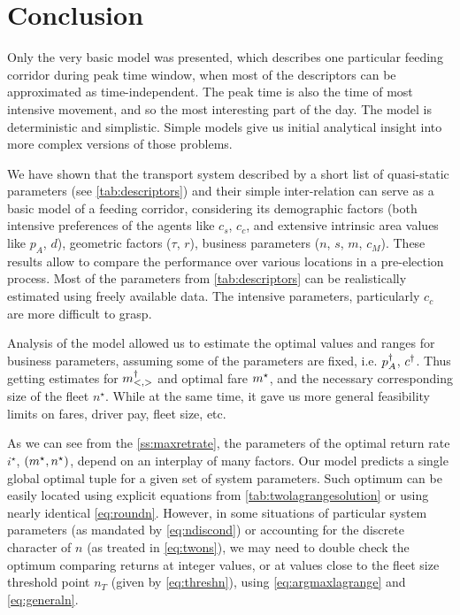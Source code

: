 \documentclass[a4paper]{report}
\begin{document}
\section{Conclusion}
Only the very basic model was presented, which describes one particular feeding corridor during peak time window, when most of the descriptors can be approximated as time-independent. The peak time is also the time of most intensive movement, and so the most interesting part of the day. The model is deterministic and simplistic. Simple models give us initial analytical insight into more complex versions of those problems.

We have shown that the transport system described by a short list of quasi-static parameters (see \autoref{tab:descriptors}) and their simple inter-relation  can serve as a basic model of a feeding corridor, considering its demographic factors (both intensive preferences of the agents like $c_s$, $c_c$, and extensive intrinsic area values like $p_A$, $d$), geometric factors ($\tau$, $r$), business parameters ($n$, $s$, $m$, $c_M$). These results allow to compare the performance over various locations in a pre-election process. Most of the parameters from \autoref{tab:descriptors} can be realistically estimated using freely available data. The intensive parameters, particularly $c_c$ are more difficult to grasp. 

Analysis of the model allowed us to estimate the optimal values and ranges for business parameters, assuming some of the parameters are fixed, i.e. $p_A^{\dagger}$, $c^{\dagger}$. Thus getting estimates for $m^{\dagger}_{<,>}$ and optimal fare $m^{\star}$, and the necessary corresponding size of the fleet $n^{\star}$. While at the same time, it gave us more general feasibility limits on fares, driver pay, fleet size, etc.

As we can see from the \autoref{ss:maxretrate}, the parameters of the optimal return rate $i^\star$, $(m^{\star},n^\star)$, depend on an interplay of many factors. Our model predicts a single global optimal tuple for a given set of system parameters. Such optimum can be easily located using explicit equations from \autoref{tab:twolagrangesolution} or using nearly identical \autoref{eq:roundn}. However, in some situations of particular system parameters (as mandated by \autoref{eq:ndiscond}) or accounting for the discrete character of $n$ (as treated in \autoref{eq:twons}), we may need to double check the optimum comparing returns at integer values, or at values close to the fleet size threshold point $n_T$ (given by \autoref{eq:threshn}), using \autoref{eq:argmaxlagrange} and \autoref{eq:generaln}.
\end{document}
